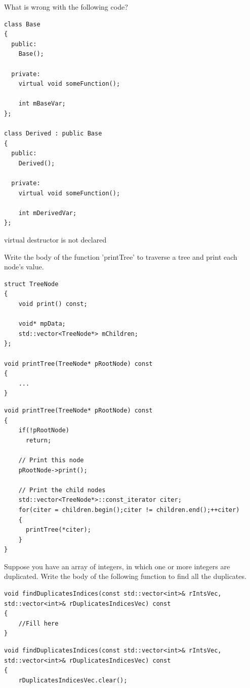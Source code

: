 \documentclass[answers]{exam}
\begin{document}
\begin{questions}
\question What is wrong with the following code?
\begin{lstlisting}
class Base
{
  public:
    Base();

  private:
    virtual void someFunction();

    int mBaseVar;
};

class Derived : public Base
{
  public:
    Derived();

  private:
    virtual void someFunction();

    int mDerivedVar;
};
\end{lstlisting}
\begin{solution}[.2in]
virtual destructor is not declared
\end{solution}

\question Write the body of the function 'printTree' to traverse a tree and print each node’s value.
\begin{lstlisting}
struct TreeNode
{
    void print() const;

    void* mpData;
    std::vector<TreeNode*> mChildren;
};

void printTree(TreeNode* pRootNode) const
{
    ...
}
\end{lstlisting}
\begin{solution}[.2in]
\begin{lstlisting}
void printTree(TreeNode* pRootNode) const
{
    if(!pRootNode)
      return;

    // Print this node
    pRootNode->print();

    // Print the child nodes
    std::vector<TreeNode*>::const_iterator citer;
    for(citer = children.begin();citer != children.end();++citer)
    {
      printTree(*citer);
    }
}
\end{lstlisting}
\end{solution}

\question Suppose you have an array of integers, in which one or more integers are duplicated.
Write the body of the following function to find all the duplicates.
\begin{lstlisting}
void findDuplicatesIndices(const std::vector<int>& rIntsVec, 
std::vector<int>& rDuplicatesIndicesVec) const
{
    //Fill here
}
\end{lstlisting}
\begin{solution}[.2in]
\begin{lstlisting}
void findDuplicatesIndices(const std::vector<int>& rIntsVec,
std::vector<int>& rDuplicatesIndicesVec) const
{
    rDuplicatesIndicesVec.clear();


\end{lstlisting}
\end{solution}
\end{questions}
\end{document}
